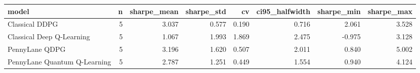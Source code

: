 \begin{tabular}{lrrrrrrr}
\toprule
model & n & sharpe_mean & sharpe_std & cv & ci95_halfwidth & sharpe_min & sharpe_max \\
\midrule
Classical DDPG & 5 & 3.037 & 0.577 & 0.190 & 0.716 & 2.061 & 3.528 \\
Classical Deep Q-Learning & 5 & 1.067 & 1.993 & 1.869 & 2.475 & -0.975 & 3.128 \\
PennyLane QDPG & 5 & 3.196 & 1.620 & 0.507 & 2.011 & 0.840 & 5.002 \\
PennyLane Quantum Q-Learning & 5 & 2.787 & 1.251 & 0.449 & 1.554 & 0.940 & 4.124 \\
\bottomrule
\end{tabular}
